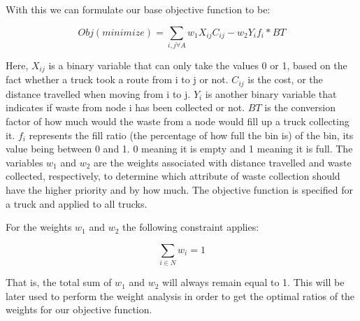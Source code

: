 \documentclass[12pt]{article}
\begin{document}
With this we can formulate our base objective function to be:

\begin{equation}\label{eq1}
    Obj(minimize)=\sum_{i,j \forall A} w_1 X_{ij} C_{ij} - w_2 Y_i f_i * BT
\end{equation}

Here, $X_{ij}$ is a binary variable that can only take the values 0 or 1, based on the fact whether a truck took a route from i to j or not. $C_{ij}$ is the cost, or the distance travelled when moving from i to j. $Y_{i}$ is another binary variable that indicates if waste from node i has been collected or not. $BT$ is the conversion factor of how much would the waste from a node would fill up a truck collecting it. $f_i$ represents the fill ratio (the percentage of how full the bin is) of the bin, its value being between 0 and 1. 0 meaning it is empty and 1 meaning it is full. The variables $w_1$ and $w_2$ are the weights associated with distance travelled and waste collected, respectively, to determine which attribute of waste collection should have the higher priority and by how much. The objective function is specified for a truck and applied to all trucks.

For the weights $w_1$ and $w_2$ the following constraint applies:

\begin{equation}\label{eq1.5}
    \sum_{i\in N} w_i = 1
\end{equation}

That is, the total sum of $w_1$ and $w_2$ will always remain equal to 1. This will be later used to perform the weight analysis in order to get the optimal ratios of the weights for our objective function.
\end{document}
